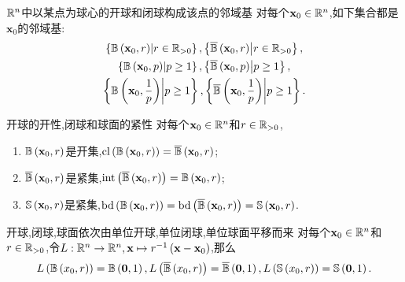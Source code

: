 \begin{proposition}{$\R^{n}$中以某点为球心的开球和闭球构成该点的邻域基}{}
	对每个$\mathbf{x}_{0}\in\R^{n}$,如下集合都是$\mathbf{x}_{0}$的邻域基:
	\begin{gather*}
		\left\{\B\left(\mathbf{x}_{0},r\right)\middle|r\in\R_{>0}\right\},\left\{\overline{\B}\left(\mathbf{x}_{0},r\right)\middle|r\in\R_{>0}\right\},\\
		\left\{\B\left(\mathbf{x}_{0},p\right)\middle|p\geq 1\right\},\left\{\overline{\B}\left(\mathbf{x}_{0},p\right)\middle|p\geq 1\right\},\\
		\left\{\B\left(\mathbf{x}_{0},\frac{1}{p}\right)\middle|p\geq 1\right\},\left\{\overline{\B}\left(\mathbf{x}_{0},\frac{1}{p}\right)\middle|p\geq 1\right\}.
	\end{gather*}
\end{proposition}

\begin{proposition}{开球的开性,闭球和球面的紧性}{}
	对每个$\mathbf{x}_{0}\in\R^{n}$和$r\in\R_{>0}$,
	\begin{enumerate}
		\item $\B\left(\mathbf{x}_{0},r\right)$是开集,$\closure\left(\B\left(\mathbf{x}_{0},r\right)\right)=\overline{\B}\left(\mathbf{x}_{0},r\right)$;
		\item $\overline{\B}\left(\mathbf{x}_{0},r\right)$是紧集,$\interior\left(\overline{\B}\left(\mathbf{x}_{0},r\right)\right)=\B\left(\mathbf{x}_{0},r\right)$;
		\item $\S\left(\mathbf{x}_{0},r\right)$是紧集,$\boundary\left(\B\left(\mathbf{x}_{0},r\right)\right)=\boundary\left(\overline{\B}\left(\mathbf{x}_{0},r\right)\right)=\S\left(\mathbf{x}_{0},r\right)$.
	\end{enumerate}
\end{proposition}

\begin{proposition}{开球,闭球,球面依次由单位开球,单位闭球,单位球面平移而来}{}
	对每个$\mathbf{x}_{0}\in\R^{n}$和$r\in\R_{>0}$,令$L:\R^{n}\to\R^{n},\mathbf{x}\mapsto r^{-1}\left(\mathbf{x}-\mathbf{x}_{0}\right)$,那么
	\begin{align*}
		L\left(\B\left(x_{0},r\right)\right)=\B\left(\mathbf{0},1\right),L\left(\overline{\B}\left(x_{0},r\right)\right)=\overline{\B}\left(\mathbf{0},1\right),L\left(\S\left(x_{0},r\right)\right)=\S\left(\mathbf{0},1\right).
	\end{align*}
\end{proposition}

